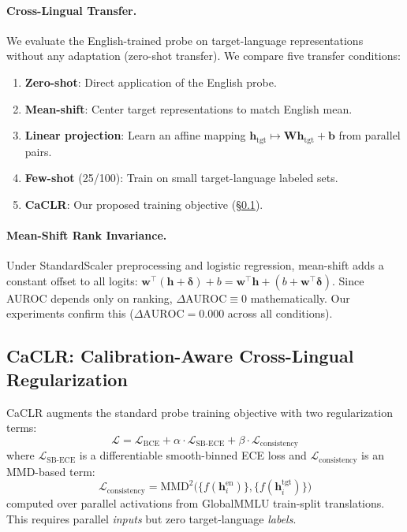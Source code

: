 \documentclass[11pt,a4paper]{article}
\begin{document}
\paragraph{Cross-Lingual Transfer.}
We evaluate the English-trained probe on target-language representations without any adaptation (zero-shot transfer). We compare five transfer conditions:

\begin{enumerate}[itemsep=1pt,parsep=0pt]
    \item \textbf{Zero-shot}: Direct application of the English probe.
    \item \textbf{Mean-shift}: Center target representations to match English mean.
    \item \textbf{Linear projection}: Learn an affine mapping $\mathbf{h}_{\text{tgt}} \mapsto \mathbf{W}\mathbf{h}_{\text{tgt}} + \mathbf{b}$ from parallel pairs.
    \item \textbf{Few-shot} (25/100): Train on small target-language labeled sets.
    \item \textbf{CaCLR}: Our proposed training objective (\S\ref{sec:caclr}).
\end{enumerate}

\paragraph{Mean-Shift Rank Invariance.}
Under StandardScaler preprocessing and logistic regression, mean-shift adds a constant offset to all logits: $\mathbf{w}^\top (\mathbf{h} + \boldsymbol{\delta}) + b = \mathbf{w}^\top \mathbf{h} + (b + \mathbf{w}^\top \boldsymbol{\delta})$. Since AUROC depends only on ranking, $\Delta\text{AUROC} \equiv 0$ mathematically. Our experiments confirm this ($\Delta\text{AUROC} = 0.000$ across all conditions).

\subsection{CaCLR: Calibration-Aware Cross-Lingual Regularization}
\label{sec:caclr}

CaCLR augments the standard probe training objective with two regularization terms:
\begin{equation}
\mathcal{L} = \mathcal{L}_{\text{BCE}} + \alpha \cdot \mathcal{L}_{\text{SB-ECE}} + \beta \cdot \mathcal{L}_{\text{consistency}}
\end{equation}
where $\mathcal{L}_{\text{SB-ECE}}$ is a differentiable smooth-binned ECE loss and $\mathcal{L}_{\text{consistency}}$ is an MMD-based term:
\begin{equation}
\mathcal{L}_{\text{consistency}} = \text{MMD}^2\big(\{f(\mathbf{h}_i^{\text{en}})\}, \{f(\mathbf{h}_i^{\text{tgt}})\}\big)
\end{equation}
computed over parallel activations from GlobalMMLU train-split translations. This requires parallel \emph{inputs} but zero target-language \emph{labels}.
\end{document}
